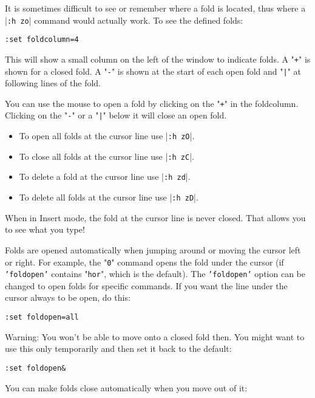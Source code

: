 It is sometimes difficult to see or remember where a fold is located, thus where a |\texttt{:h zo}| command would actually work.
To see the defined folds:

\begin{Verbatim}[samepage=true]
 :set foldcolumn=4
\end{Verbatim}

This will show a small column on the left of the window to indicate folds.
A "\texttt{+}" is shown for a closed fold.
A "\texttt{-}" is shown at the start of each open fold and "\texttt{|}" at following lines of the fold.

You can use the mouse to open a fold by clicking on the "\texttt{+}" in the foldcolumn.
Clicking on the "\texttt{-}" or a "\texttt{|}" below it will close an open fold.

\begin{itemize}
	\item To open all folds at the cursor line use |\texttt{:h zO}|.
	\item To close all folds at the cursor line use |\texttt{:h zC}|.
	\item To delete a fold at the cursor line use |\texttt{:h zd}|.
	\item To delete all folds at the cursor line use |\texttt{:h zD}|.
\end{itemize}


When in Insert mode, the fold at the cursor line is never closed.
That allows you to see what you type!

Folds are opened automatically when jumping around or moving the cursor left or right.
For example, the "\texttt{0}" command opens the fold under the cursor (if \texttt{'foldopen'} contains "\texttt{hor}", which is the default).
The \texttt{'foldopen'} option can be changed to open folds for specific commands.
If you want the line under the cursor always to be open, do this:

\begin{Verbatim}[samepage=true]
 :set foldopen=all
\end{Verbatim}

Warning: You won't be able to move onto a closed fold then.
You might want to use this only temporarily and then set it back to the default:

\begin{Verbatim}[samepage=true]
 :set foldopen&
\end{Verbatim}

You can make folds close automatically when you move out of it:

